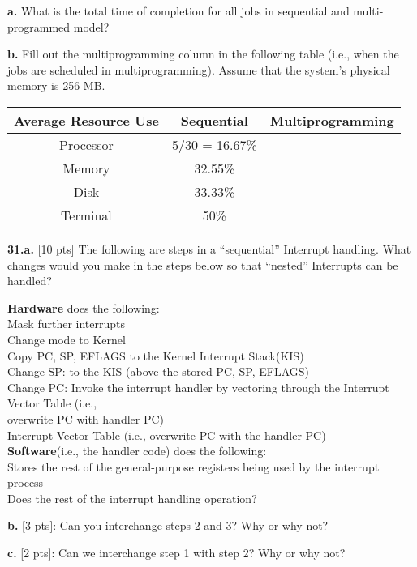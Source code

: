 \documentclass[12pt]{article}
\newcommand\tab[1][1cm]{\hspace*{#1}}
\begin{document}
{\bf a.} What is the total time of completion for all jobs in sequential and multi-programmed model? 

{\bf b.} Fill out the multiprogramming column in the following table (i.e., when the jobs are scheduled in multiprogramming). Assume that the system's physical memory is 256 MB.

\begin{center}
\begin{tabular}{| c || c | c |}
\hline
Average Resource Use & Sequential & Multiprogramming\\
\hline\hline
Processor & 5/30 = 16.67\% &\\
\hline
Memory & 32.55\% &\\
\hline
Disk & 33.33\% & \\
\hline
Terminal & 50\% &\\
\hline
\end{tabular}
\end{center}

\bigskip

{\bf 31.a.} [10 pts] The following are steps in a “sequential” Interrupt handling. What changes would you make in the steps below so that “nested” Interrupts can be handled?

\noindent
{\bf Hardware} does the following:\\
\tab Mask further interrupts\\
\tab Change mode to Kernel\\
\tab Copy PC, SP, EFLAGS to the Kernel Interrupt Stack(KIS)\\
\tab Change SP: to the KIS (above the stored PC, SP, EFLAGS)\\
\tab Change PC: Invoke the interrupt handler by vectoring through the Interrupt Vector Table (i.e.,\\ \tab overwrite PC with handler PC)\\
\tab Interrupt Vector Table (i.e., overwrite PC with the handler PC)\\

\noindent
{\bf Software}(i.e., the handler code) does the following:\\
\tab Stores the rest of the general-purpose registers being used by the interrupt process\\
\tab Does the rest of the interrupt handling operation? 

{\bf b.} [3 pts]: Can you interchange steps 2 and 3? Why or why not?

{\bf c.} [2 pts]: Can we interchange step 1 with step 2? Why or why not?
\end{document}
